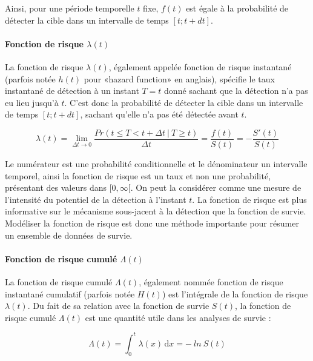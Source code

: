 Ainsi, pour une période temporelle $t$ fixe, $f(t)$ est égale à la probabilité de détecter la cible dans un intervalle de temps $[t;t+dt]$. 

\paragraph{Fonction de risque $\lambda(t)$\\}
La fonction de risque $\lambda(t)$, également appelée fonction de risque instantané (parfois notée $h(t)$ pour «hazard function» en anglais), spécifie le taux instantané de détection à un instant $T=t$ donné sachant que la détection n'a pas eu lieu jusqu'à $t$. 
C'est donc la probabilité de détecter la cible dans un intervalle de temps $[t;t+dt]$, sachant qu'elle n'a pas été détectée avant $t$. 

\begin{equation}
\lambda(t) = \lim\limits_{\Delta t \to 0} \frac{Pr(t \leq T<t+\Delta t~|~T \geq t)}{\Delta t} = \frac{f(t)}{S(t)} = -\frac{S'(t)}{S(t)}
\end{equation}

Le numérateur est une probabilité conditionnelle et le dénominateur un intervalle temporel, ainsi la fonction de risque est un taux et non une probabilité, présentant des valeurs dans $[0, \infty[$. 
On peut la considérer comme une mesure de l'intensité du potentiel de la détection à l'instant $t$. 
La fonction de risque est plus informative sur le mécanisme sous-jacent à la détection que la fonction de survie. 
Modéliser la fonction de risque est donc une méthode importante pour résumer un ensemble de données de survie. 

\paragraph{Fonction de risque cumulé $\Lambda(t)$\\}
La fonction de risque cumulé $\Lambda(t)$, également nommée fonction de risque instantané cumulatif (parfois notée $H(t)$) est l'intégrale de la fonction de risque $\lambda(t)$. 
Du fait de sa relation avec la fonction de survie $S(t)$, la fonction de risque cumulé $\Lambda(t)$ est une quantité utile dans les analyses de survie :

\begin{equation}
\Lambda(t) = \int_0^t \! \lambda(x) \, \mathrm{d}x  = -~ln~S(t)
\end{equation}

